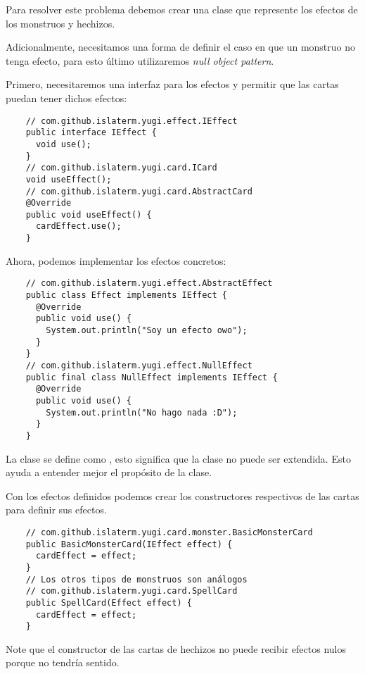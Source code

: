 \begin{Answer}[ref={ex:null-1}]
  Para resolver este problema debemos crear una clase que represente los efectos de los
  monstruos y hechizos.
  
  Adicionalmente, necesitamos una forma de definir el caso en que un monstruo no tenga 
  efecto, para esto último utilizaremos \textit{null object pattern}.
  
  Primero, necesitaremos una interfaz para los efectos y permitir que las cartas puedan
  tener dichos efectos:
  \begin{verbatim}
    // com.github.islaterm.yugi.effect.IEffect
    public interface IEffect {
      void use();
    }
    // com.github.islaterm.yugi.card.ICard
    void useEffect();
    // com.github.islaterm.yugi.card.AbstractCard
    @Override
    public void useEffect() {
      cardEffect.use();
    }      
  \end{verbatim}

  Ahora, podemos implementar los efectos concretos:
  \begin{verbatim}
    // com.github.islaterm.yugi.effect.AbstractEffect
    public class Effect implements IEffect {
      @Override
      public void use() {
        System.out.println("Soy un efecto owo");
      }
    }
    // com.github.islaterm.yugi.effect.NullEffect  
    public final class NullEffect implements IEffect {
      @Override
      public void use() {
        System.out.println("No hago nada :D");
      }
    }
  \end{verbatim}
  La clase  se define como , esto significa que la clase no
  puede ser extendida.
  Esto ayuda a entender mejor el propósito de la clase.
  
  Con los efectos definidos podemos crear los constructores respectivos de las cartas 
  para definir sus efectos.
  \begin{verbatim}
    // com.github.islaterm.yugi.card.monster.BasicMonsterCard
    public BasicMonsterCard(IEffect effect) {
      cardEffect = effect;
    }
    // Los otros tipos de monstruos son análogos
    // com.github.islaterm.yugi.card.SpellCard
    public SpellCard(Effect effect) {
      cardEffect = effect;
    }
  \end{verbatim}

  Note que el constructor de las cartas de hechizos no puede recibir efectos nulos 
  porque no tendría sentido.
\end{Answer}